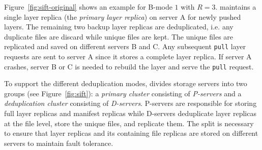 %
Figure~\ref{fig:sift-original} shows an example for B-mode $1$ with $R=3$.
\sysname maintains a single layer replica (the \emph{primary layer replica}) on server A for newly 
pushed layers.
%
%
The remaining two backup layer replicas %
are deduplicated, i.e. any
duplicate files are discard while unique files are kept.
The unique files are replicated and saved on different servers B and C.
%
%
%
Any subsequent \texttt{pull} layer requests are sent to server A since it stores a complete layer replica.
If server A crashes, server B or C is needed to rebuild the layer and serve the \texttt{pull} request.

To support the different deduplication modes, \sysname divides storage servers into two 
groups (see Figure~\ref{fig:sift}):
a \emph{primary cluster} consisting of \emph{P-servers} and a \emph{deduplication cluster}
consisting of \emph{D-servers}.
P-servers are responsible for storing full layer replicas and manifest replicas
while D-servers deduplicate layer replicas at the file level, 
store the unique files, and replicate them.
%
The split is necessary to ensure that
layer replicas and its containing file replicas are stored on different servers to maintain
fault tolerance.

